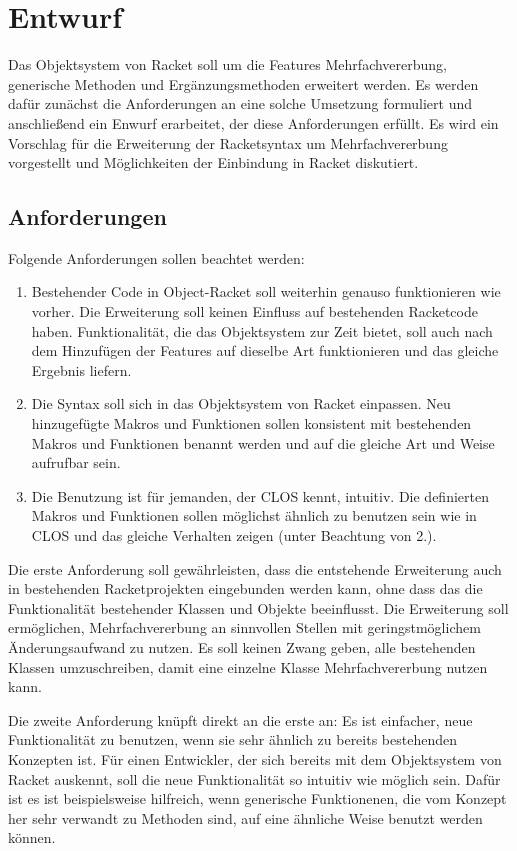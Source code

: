 \chapter{Entwurf} 
Das Objektsystem von Racket soll um die Features Mehrfachvererbung, generische Methoden und Ergänzungsmethoden erweitert werden. Es werden dafür zunächst die Anforderungen an eine solche Umsetzung formuliert und anschließend ein Enwurf erarbeitet, der diese Anforderungen erfüllt. Es wird ein Vorschlag für die Erweiterung der Racketsyntax um Mehrfachvererbung vorgestellt und Möglichkeiten der Einbindung in Racket diskutiert.

\section{Anforderungen}
Folgende Anforderungen sollen beachtet werden:
\begin{enumerate}
 \item Bestehender Code in Object-Racket soll weiterhin genauso funktionieren wie vorher. Die Erweiterung soll keinen Einfluss auf bestehenden Racketcode haben. Funktionalität, die das Objektsystem zur Zeit bietet, soll auch nach dem Hinzufügen der Features auf dieselbe Art funktionieren und das gleiche Ergebnis liefern.
 \item Die Syntax soll sich in das Objektsystem von Racket einpassen. Neu hinzugefügte Makros und Funktionen sollen konsistent mit bestehenden Makros und Funktionen benannt werden und auf die gleiche Art und Weise aufrufbar sein. 
 \item Die Benutzung ist für jemanden, der CLOS kennt, intuitiv. Die definierten Makros und Funktionen sollen möglichst ähnlich zu benutzen sein wie in CLOS und das gleiche Verhalten zeigen (unter Beachtung von 2.).
\end{enumerate}

Die erste Anforderung soll gewährleisten, dass die entstehende Erweiterung auch in bestehenden Racketprojekten eingebunden werden kann, ohne dass das die Funktionalität bestehender Klassen und Objekte beeinflusst. Die Erweiterung soll ermöglichen, Mehrfachvererbung an sinnvollen Stellen mit geringstmöglichem Änderungsaufwand zu nutzen. Es soll keinen Zwang geben, alle bestehenden Klassen umzuschreiben, damit eine einzelne Klasse Mehrfachvererbung nutzen kann.

Die zweite Anforderung knüpft direkt an die erste an: Es ist einfacher, neue Funktionalität zu benutzen, wenn sie sehr ähnlich zu bereits bestehenden Konzepten ist. Für einen Entwickler, der sich bereits mit dem Objektsystem von Racket auskennt, soll die neue Funktionalität so intuitiv wie möglich sein. Dafür ist es ist beispielsweise hilfreich, wenn generische Funktionenen, die vom Konzept her sehr verwandt zu Methoden sind, auf eine ähnliche Weise benutzt werden können.

